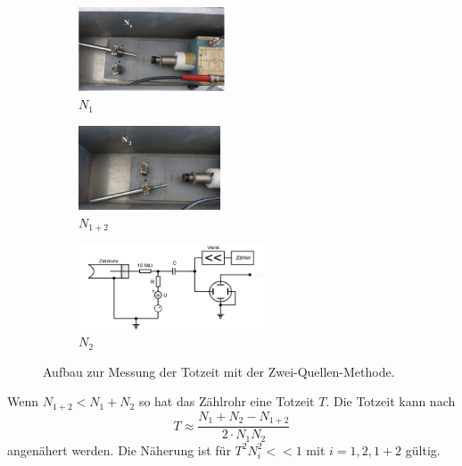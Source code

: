 \begin{figure}
    \centering
    \begin{subfigure}{0.3\textwidth}
        \includegraphics[height=2.5cm]{content/data/N1.jpg}
        \caption{$N_1$}
        \label{fig:N1}
    \end{subfigure}
    \begin{subfigure}{0.3\textwidth}
        \includegraphics[height=2.5cm]{content/data/N2.jpg}
        \caption{$N_{1+2}$}
        \label{fig:N12}
    \end{subfigure}
    \begin{subfigure}{0.3\textwidth}
        \includegraphics[height=2.5cm]{content/data/aufbau.jpg}
        \caption{$N_2$}
        \label{fig:N2}
    \end{subfigure}
    \caption{Aufbau zur Messung der Totzeit mit der Zwei-Quellen-Methode. \cite[2]{hinweise}}
    \label{fig:zweiquelle}
\end{figure}
Wenn $N_{1+2} < N_1 + N_2$ so hat das Zählrohr eine Totzeit $T$.
Die Totzeit kann nach
\begin{equation}
    T \approx \frac{N_1 + N_2 - N_{1+2}}{2 \cdot N_1 N_2}
    \label{eqn:totzeit}
\end{equation}
angenähert werden.
Die Näherung ist für $T^2 N_i^2 << 1$ mit $i = 1, 2, 1+2$ gültig.